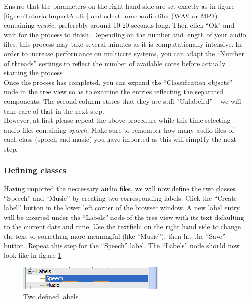 Ensure that the parameters on the right hand side are set exactly as in figure
\ref{figure:TutorialImportAudio} and select some audio files (WAV or MP3)
containing \emph{music}, preferably around 10-20 seconds long. Then click ``Ok''
and wait for the process to finish. Depending on the number and length of your
audio files, this process may take several minutes as it is computationally
intensive. In order to increase performance on multicore systems, you can adapt
the ``Number of threads'' settings to reflect the number of available cores
before actually starting the process.\\

Once the process has completed, you can expand the ``Classification objects''
node in the tree view so as to examine the entries reflecting the separated
components. The second column states that they are still ``Unlabeled'' --
we will take care of that in the next step.\\

However, at first please repeat the above procedure while this time selecting
audio files containing \emph{speech}. Make sure to remember how many audio files
of each class (speech and music) you have imported as this will simplify the
next step.


\subsubsection{Defining classes}

Having imported the neccessary audio files, we will now define the two classes
``Speech'' and ``Music'' by creating two corresponding labels. Click the
``Create label'' button in the lower left corner of the browser window. A new
label entry will be inserted under the ``Labels'' node of the tree view with its
text defaulting to the current date and time. Use the textfield on the right
hand side to change the text to something more meaningful (like ``Music''), then
hit the ``Save'' button. Repeat this step for the ``Speech'' label. The
``Labels'' node should now look like in figure \ref{figure:TutorialLabels}.

\begin{figure}
    \centering
    \includegraphics[width=.5\textwidth]{tutorial-media/Labels.png}
    \caption{%
        \label{figure:TutorialLabels}%
        Two defined labels
    }
\end{figure}


